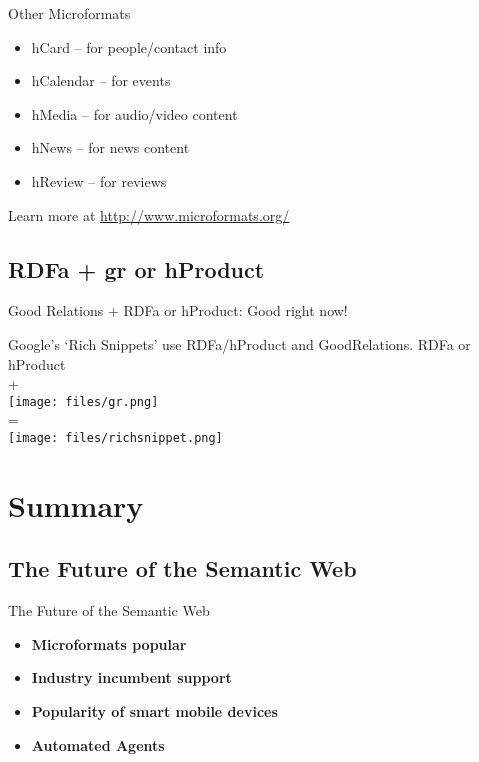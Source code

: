 \documentclass{beamer}
\begin{document}
\begin{frame}{Other Microformats}
\begin{itemize}
\item hCard -- for people/contact info
\item hCalendar -- for events
\item hMedia -- for audio/video content
\item hNews -- for news content
\item hReview -- for reviews
\end{itemize}

Learn more at \url{http://www.microformats.org/}
\end{frame}



\subsection[RDFa + gr or hProduct]{RDFa + gr or hProduct}
\begin{frame}{Good Relations + RDFa or hProduct: Good right now!}
\begin{center}
Google's `Rich Snippets' use RDFa/hProduct and GoodRelations.
{\huge RDFa or hProduct\\
\vspace{0.25cm}
+}\\
\vspace{0.25cm}
\texttt{[image: files/gr.png]}\\
\vspace{0.25cm}
{\huge =}\\
\vspace{0.25cm}
\texttt{[image: files/richsnippet.png]}\\
\end{center}
\end{frame}

\section[Summary]{Summary}
\subsection[Future]{The Future of the Semantic Web}
\begin{frame}{The Future of the Semantic Web}

\begin{itemize}
\item\textbf{Microformats popular}\\

\item\textbf{Industry incumbent support}\\

\item\textbf{Popularity of smart mobile devices}\\

\item\textbf{Automated Agents}
\end{itemize}

\end{frame}
\end{document}
